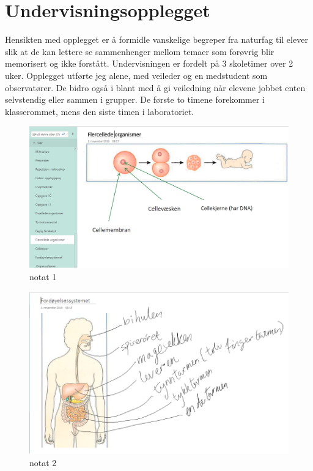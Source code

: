 \documentclass[main.tex]{subfiles}
\begin{document}
\section*{Undervisningsopplegget}
\label{sec:1}
Hensikten med opplegget er å formidle vanskelige begreper fra naturfag til elever
slik at de kan lettere se sammenhenger mellom temaer som forøvrig blir memorisert
og ikke forstått. Undervisningen er fordelt på 3 skoletimer over 2 uker. Opplegget utførte jeg alene, 
med veileder og en medstudent som observatører. De bidro også i blant med å gi veiledning når elevene jobbet
enten selvstendig eller sammen i grupper. De første to timene forekommer i klasserommet, mens den siste timen
i laboratoriet.

\begin{figure}[h!]
\includegraphics[scale = 0.6]{../figures/onenote_flercellet.png}
\caption{notat 1}
\label{fig:notat1}
\end{figure}

\begin{figure}[h!]
\includegraphics[scale = 0.6]{../figures/onenote_fordoyelse.png}
\caption{notat 2}
\label{fig:notat2}
\end{figure}
\end{document}

